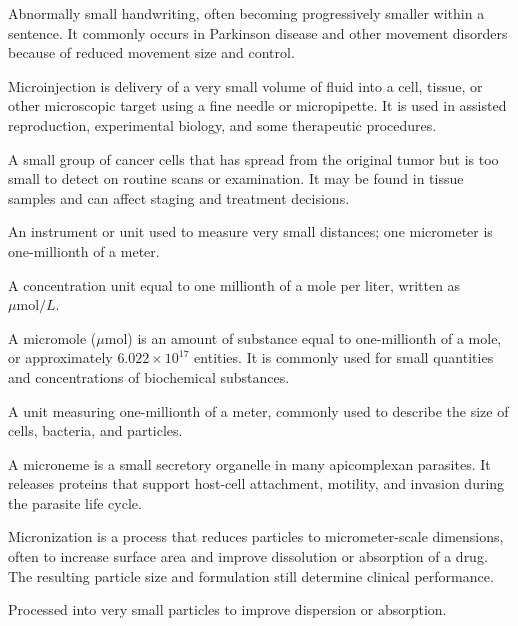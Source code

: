  Abnormally small handwriting, often becoming progressively smaller within a sentence. It commonly occurs in Parkinson disease and other movement disorders because of reduced movement size and control.

 Microinjection is delivery of a very small volume of fluid into a cell, tissue, or other microscopic target using a fine needle or micropipette. It is used in assisted reproduction, experimental biology, and some therapeutic procedures.

 A small group of cancer cells that has spread from the original tumor but is too small to detect on routine scans or examination. It may be found in tissue samples and can affect staging and treatment decisions.

 An instrument or unit used to measure very small distances; one micrometer is one-millionth of a meter.

 A concentration unit equal to one millionth of a mole per liter, written as \(\mu\mathrm{mol}/L\).

 A micromole ($\mu$mol) is an amount of substance equal to one-millionth of a mole, or approximately $6.022\times10^{17}$ entities. It is commonly used for small quantities and concentrations of biochemical substances.

 A unit measuring one-millionth of a meter, commonly used to describe the size of cells, bacteria, and particles.

 A microneme is a small secretory organelle in many apicomplexan parasites. It releases proteins that support host-cell attachment, motility, and invasion during the parasite life cycle.

 Micronization is a process that reduces particles to micrometer-scale dimensions, often to increase surface area and improve dissolution or absorption of a drug. The resulting particle size and formulation still determine clinical performance.

 Processed into very small particles to improve dispersion or absorption.

